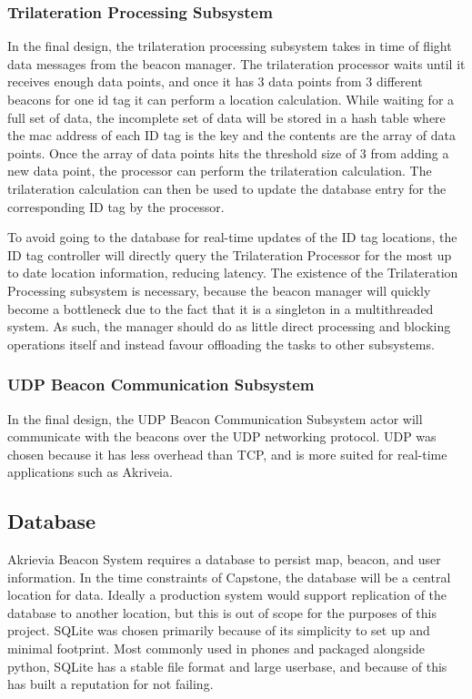 \subsubsection{Trilateration Processing Subsystem}
\medskip
In the final design, the trilateration processing subsystem takes in time of flight data messages from the beacon manager.
The trilateration processor waits until it receives enough data points, and once it has 3 data points from 3 different beacons for one id tag it can perform a location calculation.
While waiting for a full set of data, the incomplete set of data will be stored in a hash table where the mac address of each ID tag is the key and the contents are the array of data points.
Once the array of data points hits the threshold size of 3 from adding a new data point, the processor can perform the trilateration calculation.
The trilateration calculation can then be used to update the database entry for the corresponding ID tag by the processor.

\bigskip
To avoid going to the database for real-time updates of the ID tag locations, the ID tag controller will directly query the Trilateration Processor for the most up to date location information, reducing latency. The existence of the Trilateration Processing subsystem is necessary, because the beacon manager will quickly become a bottleneck due to the fact that it is a singleton in a multithreaded system.
As such, the manager should do as little direct processing and blocking operations itself and instead favour offloading the tasks to other subsystems.

\medskip
\subsubsection{UDP Beacon Communication Subsystem}
\medskip
In the final design, the UDP Beacon Communication Subsystem actor will communicate with the beacons over the UDP networking protocol.
UDP was chosen because it has less overhead than TCP, and is more suited for real-time applications such as Akriveia.

\medskip
\subsection{Database}
\medskip
Akrievia Beacon System requires a database to persist map, beacon, and user information.
In the time constraints of Capstone, the database will be a central location for data.
Ideally a production system would support replication of the database to another location, but this is out of scope for the purposes of this project.
SQLite was chosen primarily because of its simplicity to set up and minimal footprint.
Most commonly used in phones and packaged alongside python, SQLite has a stable file format and large userbase, and because of this has built a reputation for not failing.

